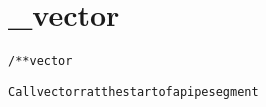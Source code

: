\section{_vector}
\begin{shaded}
\begin{alltt}
/** vector

  Call vectorr at the start of a pipe segment

\end{alltt}
\end{shaded}

